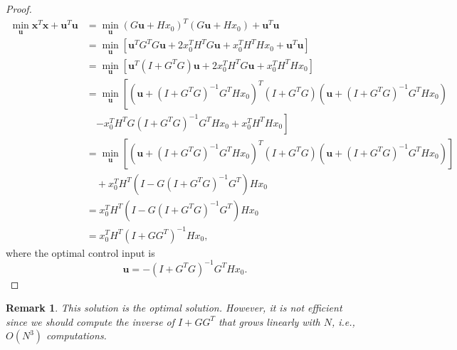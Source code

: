 \documentclass[a4 paper]{article}
\numberwithin{equation}{section}
\theoremstyle{boldStyle}
\newtheorem{remark}{Remark}[section]
\theoremstyle{boldBlueStyle}
\theoremstyle{boldPurpleStyle}
\theoremstyle{boldRedStyle}
\begin{document}
\begin{proof}
  \begin{align*}
  \min_{\mathbf{u}} \mathbf{x}^T \mathbf{x} + \mathbf{u}^T \mathbf{u} &= \min_{\mathbf{u}} (G\mathbf{u} + H x_0)^T (G\mathbf{u} + H x_0) + \mathbf{u}^T \mathbf{u} \\
  &= \min_{\mathbf{u}} \left[ \mathbf{u}^T G^T G \mathbf{u} + 2 x_0^T H^T G \mathbf{u} + x_0^T H^T H x_0 + \mathbf{u}^T \mathbf{u} \right] \\
  &= \min_{\mathbf{u}} \left[ \mathbf{u}^T (I + G^T G) \mathbf{u} + 2 x_0^T H^T G \mathbf{u} + x_0^T H^T H x_0 \right] \\
  &= \min_{\mathbf{u}} \left[ (\mathbf{u} + (I + G^T G)^{-1} G^T H x_0)^T (I + G^T G) (\mathbf{u} + (I + G^T G)^{-1} G^T H x_0) \right. \\
  & \quad \left. - x_0^T H^T G (I + G^T G)^{-1} G^T H x_0 + x_0^T H^T H x_0 \right] \\
  &= \min_{\mathbf{u}} \left[ (\mathbf{u} + (I + G^T G)^{-1} G^T H x_0)^T (I + G^T G) (\mathbf{u} + (I + G^T G)^{-1} G^T H x_0) \right] \\
  & \quad + x_0^T H^T (I - G (I + G^T G)^{-1} G^T) H x_0 \\
  &= x_0^T H^T (I - G (I + G^T G)^{-1} G^T) H x_0 \\
  &= x_0^T H^T (I + G G^T)^{-1} H x_0,
  \end{align*}
  where the optimal control input is
  \[
  \mathbf{u} = -(I + G^T G)^{-1} G^T H x_0.
  \]
\end{proof}
      
  
\begin{remark}
  This solution is the optimal solution. However, it is not efficient since we should compute the inverse of
  \( I + G G^T \) that grows linearly with \( N \), i.e., \( O(N^3) \) computations. 
\end{remark}
  













\newpage
\end{document}
